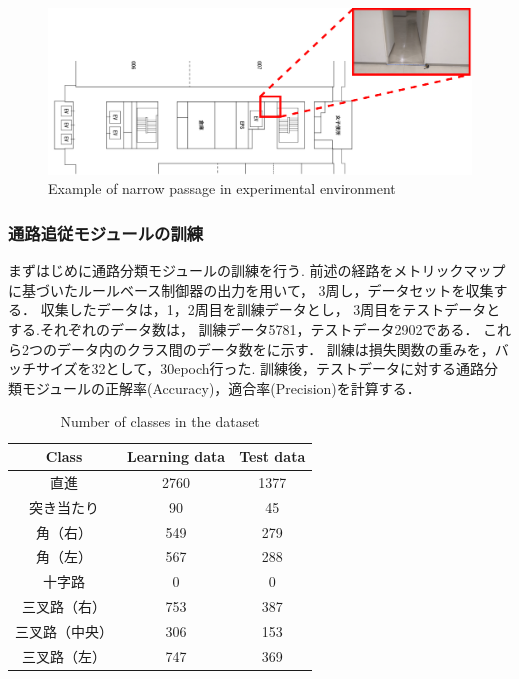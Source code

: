 \begin{figure}[htbp]
    \centering
     \includegraphics[width=130mm]{images/pdf/sce_semai.pdf}
     \caption{Example of narrow passage in experimental environment}\label{fig:semai}
\end{figure}

\clearpage
\subsubsection{通路追従モジュールの訓練}
まずはじめに通路分類モジュールの訓練を行う.
前述の経路をメトリックマップに基づいたルールベース制御器の出力を用いて，
3周し，データセットを収集する．
収集したデータは，1，2周目を訓練データとし，
3周目をテストデータとする.それぞれのデータ数は，
訓練データ5781，テストデータ2902である．
これら2つのデータ内のクラス間のデータ数をに示す．
訓練は損失関数の重みを，バッチサイズを32として，30epoch行った.
訓練後，テストデータに対する通路分類モジュールの正解率{(Accuracy)}，適合率{(Precision)}を計算する．
\begin{table}[htbp]
    \centering
    \caption{Number of classes in the dataset}\label{tab:dataset}
    \begin{tabular}{c|c|c}
    \hline
    Class & Learning data &Test data        \\
    \hline
    直進   & 2760 & 1377\\
    突き当たり   & 90 & 45 \\
    角（右） & 549 & 279 \\
    角（左）& 567 & 288 \\
    十字路 & 0 & 0 \\
    三叉路（右）& 753 & 387 \\
    三叉路（中央）& 306 & 153 \\
    三叉路（左） & 747 & 369 \\
    \hline
    \end{tabular}
\end{table}

